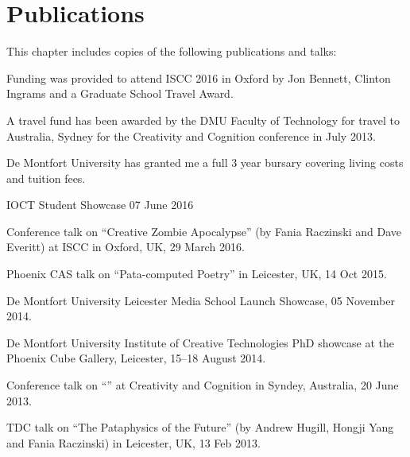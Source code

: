 
\chapter{Publications}
\label{app:pub}

This chapter includes copies of the following publications and talks:


Funding was provided to attend ISCC 2016 in Oxford by Jon Bennett, Clinton Ingrams and a Graduate School Travel Award.

A travel fund has been awarded by the DMU Faculty of Technology for travel to Australia, Sydney for the Creativity and Cognition conference in July 2013.

De Montfort University has granted me a full 3 year bursary covering living costs and tuition fees.

\spirals


IOCT Student Showcase 07 June 2016

Conference talk on ``Creative Zombie Apocalypse'' (by Fania Raczinski and Dave Everitt) at ISCC in Oxford, UK, 29 March 2016.

Phoenix CAS talk on ``Pata-computed Poetry'' in Leicester, UK, 14 Oct 2015.

De Montfort University Leicester Media School Launch Showcase, 05 November 2014.

De Montfort University Institute of Creative Technologies PhD showcase at the Phoenix Cube Gallery, Leicester, 15--18 August 2014.

Conference talk on ``'' at Creativity and Cognition in Syndey, Australia, 20 June 2013.

TDC talk on ``The Pataphysics of the Future'' (by Andrew Hugill, Hongji Yang and Fania Raczinski) in Leicester, UK, 13 Feb 2013.


